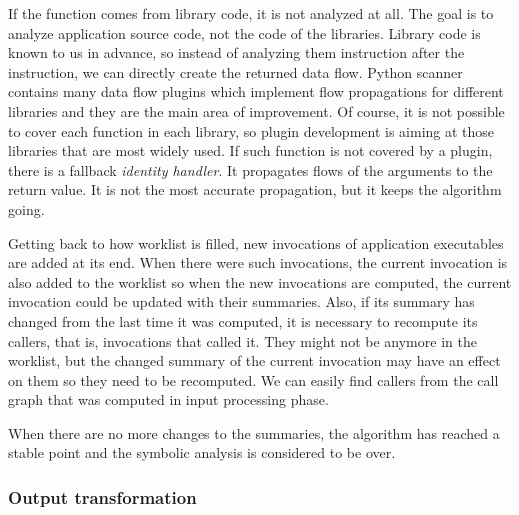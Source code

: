 \par
If the function comes from library code, it is not analyzed at all. The goal is to analyze application source code, not the code of the libraries. Library code is known to us in advance, so instead of analyzing them instruction after the instruction, we can directly create the returned data flow. Python scanner contains many data flow plugins which implement flow propagations for different libraries and they are the main area of improvement. Of course, it is not possible to cover each function in each library, so plugin development is aiming at those libraries that are most widely used. If such function is not covered by a plugin, there is a fallback \textit{identity handler}. It propagates flows of the arguments to the return value. It is not the most accurate propagation, but it keeps the algorithm going.
\par
Getting back to how worklist is filled, new invocations of application executables are added at its end. When there were such invocations, the current invocation is also added to the worklist so when the new invocations are computed, the current invocation could be updated with their summaries. Also, if its summary has changed from the last time it was computed, it is necessary to recompute its callers, that is, invocations that called it. They might not be anymore in the worklist, but the changed summary of the current invocation may have an effect on them so they need to be recomputed. We can easily find callers from the call graph that was computed in input processing phase.
\par
When there are no more changes to the summaries, the algorithm has reached a stable point and the symbolic analysis is considered to be over.

\subsubsection{Output transformation}

